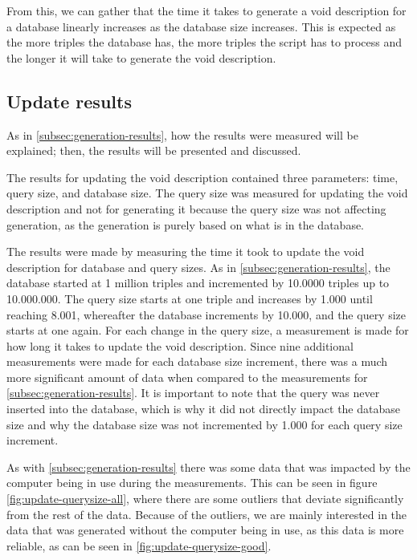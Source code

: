 From this, we can gather that the time it takes to generate a \gls{void} description for a database linearly increases as the database size increases. This is expected as the more triples the database has, the more triples the script has to process and the longer it will take to generate the \gls{void} description.


\subsection{Update results}\label{subsec:update-results}
As in \autoref{subsec:generation-results}, how the results were measured will be explained; then, the results will be presented and discussed.

The results for updating the \gls{void} description contained three parameters: time, query size, and database size. The query size was measured for updating the \gls{void} description and not for generating it because the query size was not affecting generation, as the generation is purely based on what is in the database.

The results were made by measuring the time it took to update the \gls{void} description for database and query sizes. As in \autoref{subsec:generation-results}, the database started at 1 million triples and incremented by 10.0000 triples up to 10.000.000. The query size starts at one triple and increases by 1.000 until reaching 8.001, whereafter the database increments by 10.000, and the query size starts at one again. For each change in the query size, a measurement is made for how long it takes to update the \gls{void} description. Since nine additional measurements were made for each database size increment, there was a much more significant amount of data when compared to the measurements for \autoref{subsec:generation-results}. It is important to note that the query was never inserted into the database, which is why it did not directly impact the database size and why the database size was not incremented by 1.000 for each query size increment.

As with \autoref{subsec:generation-results} there was some data that was impacted by the computer being in use during the measurements. This can be seen in figure \autoref{fig:update-querysize-all}, where there are some outliers that deviate significantly from the rest of the data. Because of the outliers, we are mainly interested in the data that was generated without the computer being in use, as this data is more reliable, as can be seen in \autoref{fig:update-querysize-good}.

